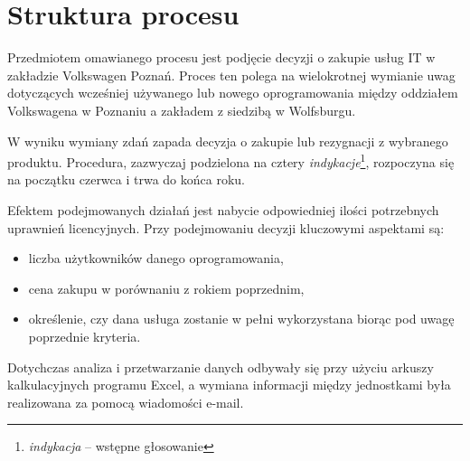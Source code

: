 \section{Struktura procesu}
Przedmiotem omawianego procesu jest podjęcie decyzji o zakupie usług IT w zakładzie Volkswagen Poznań. Proces ten polega na wielokrotnej wymianie uwag dotyczących wcześniej używanego lub nowego oprogramowania między oddziałem Volkswagena w Poznaniu a zakładem z siedzibą w Wolfsburgu.

W wyniku wymiany zdań zapada decyzja o zakupie lub rezygnacji z wybranego produktu. Procedura, zazwyczaj podzielona na cztery \emph{indykacje}\footnote{\emph{indykacja} – wstępne głosowanie}, rozpoczyna się na początku czerwca i trwa do końca roku.

Efektem podejmowanych działań jest nabycie odpowiedniej ilości potrzebnych uprawnień licencyjnych. Przy
podejmowaniu decyzji kluczowymi aspektami są:
\begin{itemize}
    \item liczba użytkowników danego oprogramowania,
    \item cena zakupu w porównaniu z rokiem poprzednim,
    \item określenie, czy dana usługa zostanie w pełni wykorzystana biorąc pod uwagę poprzednie kryteria.
\end{itemize}
Dotychczas analiza i przetwarzanie danych odbywały się przy użyciu arkuszy kalkulacyjnych programu Excel, a wymiana informacji między jednostkami była realizowana za pomocą wiadomości e-mail.
